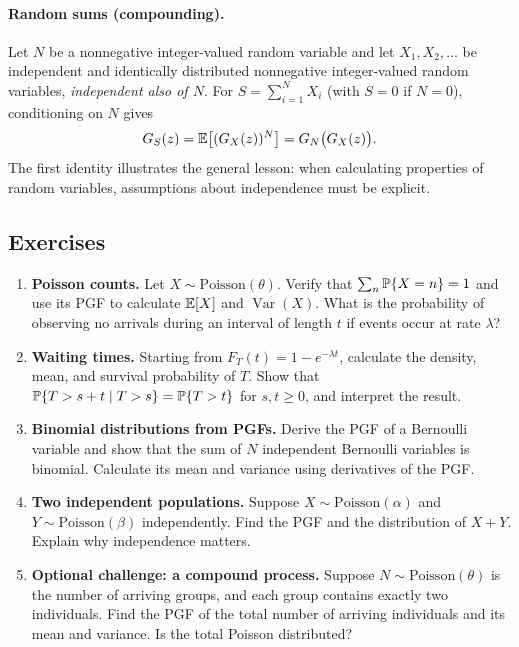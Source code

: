 \paragraph{Random sums (compounding).}
Let $N$ be a nonnegative integer-valued random variable and let $X_1,X_2,\ldots$ be independent and identically distributed nonnegative integer-valued random variables, \emph{independent also of $N$}. For $S=\sum_{i=1}^{N}X_i$ (with $S=0$ if $N=0$), conditioning on $N$ gives
\begin{equation}
 G_S(z)={\mathbb E}\big[(G_X(z))^N\big]=G_N\big(G_X(z)\big).
 \label{eq:basic_compound}
\end{equation}
The first identity illustrates the general lesson: when calculating properties of random variables, assumptions about independence must be explicit.

\subsection{Exercises}
\label{sec:basic_exercises}
\begin{enumerate}[label=\textbf{Exercise \arabic*.},leftmargin=*]
 \item \textbf{Poisson counts.} Let $X\sim\mathrm{Poisson}(\theta)$. Verify that $\sum_n{\mathbb P}\{X=n\}=1$ and use its PGF to calculate ${\mathbb E}[X]$ and $\operatorname{Var}(X)$. What is the probability of observing no arrivals during an interval of length $t$ if events occur at rate $\lambda$?
 \item \textbf{Waiting times.} Starting from $F_T(t)=1-e^{-\lambda t}$, calculate the density, mean, and survival probability of $T$. Show that ${\mathbb P}\{T>s+t\mid T>s\}={\mathbb P}\{T>t\}$ for $s,t\geq0$, and interpret the result.
 \item \textbf{Binomial distributions from PGFs.} Derive the PGF of a Bernoulli variable and show that the sum of $N$ independent Bernoulli variables is binomial. Calculate its mean and variance using derivatives of the PGF.
 \item \textbf{Two independent populations.} Suppose $X\sim\mathrm{Poisson}(\alpha)$ and $Y\sim\mathrm{Poisson}(\beta)$ independently. Find the PGF and the distribution of $X+Y$. Explain why independence matters.
 \item \textbf{Optional challenge: a compound process.} Suppose $N\sim\mathrm{Poisson}(\theta)$ is the number of arriving groups, and each group contains exactly two individuals. Find the PGF of the total number of arriving individuals and its mean and variance. Is the total Poisson distributed?
\end{enumerate}

